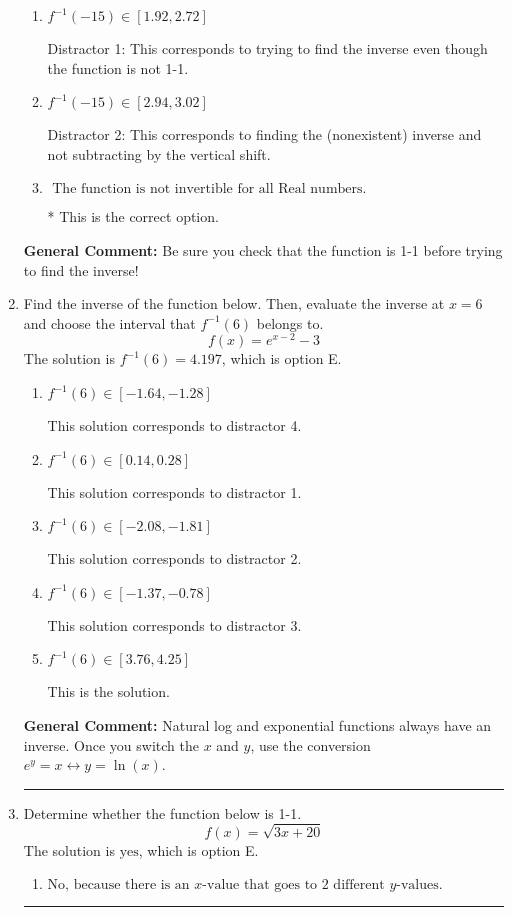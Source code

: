\documentclass{extbook}[14pt]
\newcommand{\litem}[1]{\item #1

\rule{\textwidth}{0.4pt}}
\begin{document}
\begin{enumerate}
{\begin{enumerate}[label=\Alph*.]
 Distractor 3: This corresponds to finding the (nonexistent) inverse and dividing by a negative.
\item \( f^{-1}(-15) \in [1.92, 2.72] \)

 Distractor 1: This corresponds to trying to find the inverse even though the function is not 1-1. 
\item \( f^{-1}(-15) \in [2.94, 3.02] \)

 Distractor 2: This corresponds to finding the (nonexistent) inverse and not subtracting by the vertical shift.
\item \( \text{ The function is not invertible for all Real numbers. } \)

* This is the correct option.
\end{enumerate}

\textbf{General Comment:} Be sure you check that the function is 1-1 before trying to find the inverse!
}
\litem{
Find the inverse of the function below. Then, evaluate the inverse at $x = 6$ and choose the interval that $f^{-1}(6)$ belongs to.
\[ f(x) = e^{x-2}-3 \]The solution is \( f^{-1}(6) = 4.197 \), which is option E.\begin{enumerate}[label=\Alph*.]
\item \( f^{-1}(6) \in [-1.64, -1.28] \)

 This solution corresponds to distractor 4.
\item \( f^{-1}(6) \in [0.14, 0.28] \)

 This solution corresponds to distractor 1.
\item \( f^{-1}(6) \in [-2.08, -1.81] \)

 This solution corresponds to distractor 2.
\item \( f^{-1}(6) \in [-1.37, -0.78] \)

 This solution corresponds to distractor 3.
\item \( f^{-1}(6) \in [3.76, 4.25] \)

 This is the solution.
\end{enumerate}

\textbf{General Comment:} Natural log and exponential functions always have an inverse. Once you switch the $x$ and $y$, use the conversion $ e^y = x \leftrightarrow y=\ln(x)$.
}
\litem{
Determine whether the function below is 1-1.
\[ f(x) = \sqrt{3 x + 20} \]The solution is \( \text{yes} \), which is option E.\begin{enumerate}[label=\Alph*.]
\item \( \text{No, because there is an $x$-value that goes to 2 different $y$-values.} \)


\end{enumerate}}
\end{enumerate}
\end{document}
